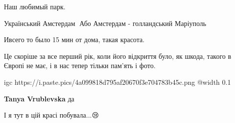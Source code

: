  
 
 
 
 

\qqSecCmt


Наш любимый парк.


Український Амстердам🌷 Або Амстердам - голландський Маріуполь🌷


Ивсего то было 15 мин от дома, такая красота.


Це скоріше за все перший рік, коли його відкриття було, як шкода, такого в
Європі не має, і в нас тепер тільки пам'ять і фото.

\ifcmt
  igc https://i.paste.pics/4a099818d795af20670f3e704783b45c.png
	@width 0.1
\fi

\begin{itemize} %
\textbf{Tanya Vrublevska} да
\end{itemize} %


І я тут в цій красі побувала...😢
